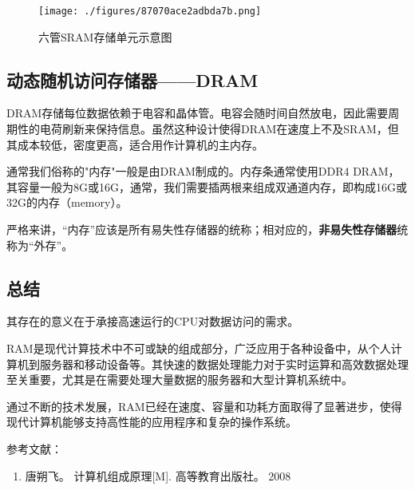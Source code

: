 \begin{figure}[ht]
\centering
\texttt{[image: ./figures/87070ace2adbda7b.png]}
\caption{六管SRAM存储单元示意图} \label{fig_RAM_3}
\end{figure}


\subsection{动态随机访问存储器——DRAM}

DRAM存储每位数据依赖于电容和晶体管。电容会随时间自然放电，因此需要周期性的电荷刷新来保持信息。虽然这种设计使得DRAM在速度上不及SRAM，但其成本较低，密度更高，适合用作计算机的主内存。

通常我们俗称的"内存"一般是由DRAM制成的。内存条通常使用DDR4 DRAM，其容量一般为8G或16G，通常，我们需要插两根来组成双通道内存，即构成16G或32G的内存（memory）。

严格来讲，“内存”应该是所有易失性存储器的统称；相对应的，\textbf{非易失性存储器}统称为“外存”。



\subsection{总结}
其存在的意义在于承接高速运行的CPU对数据访问的需求。

RAM是现代计算技术中不可或缺的组成部分，广泛应用于各种设备中，从个人计算机到服务器和移动设备等。其快速的数据处理能力对于实时运算和高效数据处理至关重要，尤其是在需要处理大量数据的服务器和大型计算机系统中。




通过不断的技术发展，RAM已经在速度、容量和功耗方面取得了显著进步，使得现代计算机能够支持高性能的应用程序和复杂的操作系统。


参考文献：
\begin{enumerate}
\item 唐朔飞。 计算机组成原理[M]. 高等教育出版社。 2008
\end{enumerate}
